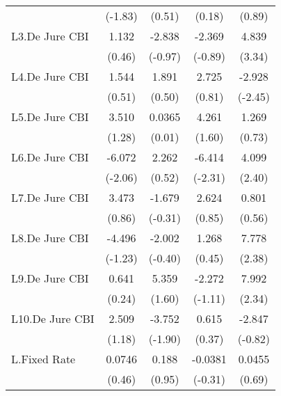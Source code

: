 {\begin{longtable}{l*{4}{c}}
                &  (-1.83)         &   (0.51)         &   (0.18)         &   (0.89)         \\
[1em]
L3.De Jure CBI  &    1.132         &   -2.838         &   -2.369         &    4.839\sym{***}\\
                &   (0.46)         &  (-0.97)         &  (-0.89)         &   (3.34)         \\
[1em]
L4.De Jure CBI  &    1.544         &    1.891         &    2.725         &   -2.928\sym{*}  \\
                &   (0.51)         &   (0.50)         &   (0.81)         &  (-2.45)         \\
[1em]
L5.De Jure CBI  &    3.510         &   0.0365         &    4.261         &    1.269         \\
                &   (1.28)         &   (0.01)         &   (1.60)         &   (0.73)         \\
[1em]
L6.De Jure CBI  &   -6.072\sym{*}  &    2.262         &   -6.414\sym{*}  &    4.099\sym{*}  \\
                &  (-2.06)         &   (0.52)         &  (-2.31)         &   (2.40)         \\
[1em]
L7.De Jure CBI  &    3.473         &   -1.679         &    2.624         &    0.801         \\
                &   (0.86)         &  (-0.31)         &   (0.85)         &   (0.56)         \\
[1em]
L8.De Jure CBI  &   -4.496         &   -2.002         &    1.268         &    7.778\sym{*}  \\
                &  (-1.23)         &  (-0.40)         &   (0.45)         &   (2.38)         \\
[1em]
L9.De Jure CBI  &    0.641         &    5.359         &   -2.272         &    7.992\sym{*}  \\
                &   (0.24)         &   (1.60)         &  (-1.11)         &   (2.34)         \\
[1em]
L10.De Jure CBI &    2.509         &   -3.752         &    0.615         &   -2.847         \\
                &   (1.18)         &  (-1.90)         &   (0.37)         &  (-0.82)         \\
[1em]
L.Fixed Rate    &   0.0746         &    0.188         &  -0.0381         &   0.0455         \\
                &   (0.46)         &   (0.95)         &  (-0.31)         &   (0.69)         \\

\end{longtable}}
